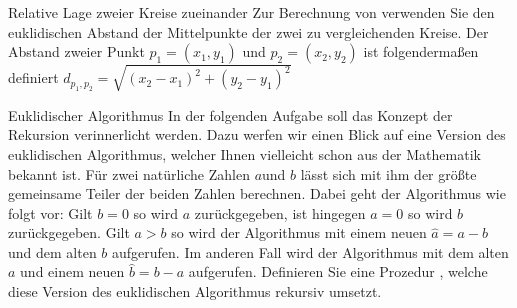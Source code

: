 \documentclass{../preamble}
\begin{document}
\begin{task}[credit = \stars{1}{3}]{Relative Lage zweier Kreise zueinander}
	    Zur Berechnung von  verwenden Sie den euklidischen Abstand der Mittelpunkte der zwei zu vergleichenden Kreise. Der Abstand zweier Punkt \(p_1 = (x_1, y_1)\) und \(p_2 = (x_2, y_2)\) ist folgendermaßen definiert \(d_{p_1, p_2} = \sqrt{(x_2 - x_1)^2 + (y_2 - y_1)^2}\)
	
	    \clearpage
	
	    \begin{solution}
	        
	    \end{solution}
	\end{task}
	
	\clearpage
	
	\begin{task}[credit = \stars{1}{3}]{Euklidischer Algorithmus}
	    In der folgenden Aufgabe soll das Konzept der Rekursion verinnerlicht werden. Dazu werfen wir einen Blick auf eine Version des euklidischen Algorithmus, welcher Ihnen vielleicht schon aus der Mathematik bekannt ist. Für zwei natürliche Zahlen \(a\)und \(b\) lässt sich mit ihm der größte gemeinsame Teiler der beiden Zahlen berechnen. Dabei geht der Algorithmus wie folgt vor:
	    \br
	    Gilt \(b = 0\) so wird \(a\) zurückgegeben, ist hingegen \(a = 0\) so wird \(b\) zurückgegeben. Gilt \(a > b\) so wird der Algorithmus mit einem neuen \(\hat{a} = a - b\) und dem \grqq alten\grqq{} \(b\) aufgerufen. Im anderen Fall wird der Algorithmus mit dem \grqq alten\grqq{} \(a\) und einem neuen \(\hat{b} = b - a\) aufgerufen. Definieren Sie eine Prozedur , welche diese Version des euklidischen Algorithmus rekursiv umsetzt.
	
	    \begin{solution}
	        
	    \end{solution}
	\end{task}
	
	\clearpage
	
\end{document}
